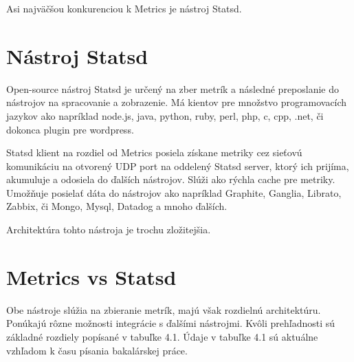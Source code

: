 \documentclass[a4paper, upjsfrontpage, disablespecwarning, thesismargins, thesislinespacing]{rnthesis}
\begin{document}
Asi najväčšou konkurenciou k Metrics je nástroj Statsd.


\section{Nástroj Statsd}

Open-source nástroj Statsd je určený na zber metrík a následné preposlanie do nástrojov na spracovanie a zobrazenie.
Má kientov pre množstvo programovacích jazykov ako napríklad node.js, java, python, ruby, perl, php, c, cpp, .net, či dokonca plugin pre wordpress. 

Statsd klient na rozdiel od Metrics posiela získane metriky cez sieťovú komunikáciu na otvorený UDP port na oddelený Statsd server, ktorý ich prijíma, akumuluje a odosiela do ďalších nástrojov. 
Slúži ako rýchla cache pre metriky. 
Umožňuje posielať dáta do nástrojov ako napríklad Graphite, Ganglia, Librato, Zabbix, či Mongo, Mysql, Datadog a mnoho ďalších.

Architektúra tohto nástroja je trochu zložitejšia.


\section{Metrics vs Statsd}

Obe nástroje slúžia na zbieranie metrík, majú však rozdielnú architektúru. 
Ponúkajú rôzne možnosti integrácie s ďalšími nástrojmi. 
Kvôli prehľadnosti sú základné rozdiely popísané v tabuľke 4.1.
Údaje v tabuľke 4.1 sú aktuálne vzhľadom k času písania bakalárskej práce.
\end{document}
